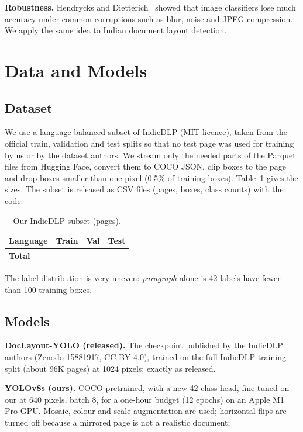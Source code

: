 \textbf{Robustness.} Hendrycks and Dietterich~\cite{hendrycks} showed that image classifiers lose much accuracy
under common corruptions such as blur, noise and JPEG compression. We apply the same idea to Indian document
layout detection.

\section{Data and Models}
\subsection{Dataset}
We use a language-balanced subset of IndicDLP (MIT licence), taken from the official train, validation and test
splits so that no test page was used for training by us or by the dataset authors. We stream only the needed
parts of the Parquet files from Hugging Face, convert them to COCO JSON, clip boxes to the page and drop boxes
smaller than one pixel (0.5\% of training boxes). Table~\ref{tab:data} gives the sizes. The subset is released as
CSV files (pages, boxes, class counts) with the code.

\begin{table}[t]
\centering
\caption{Our IndicDLP subset (pages).}
\label{tab:data}
\small
\begin{tabular}{lrrr}
\toprule
Language & Train & Val & Test \\
\midrule
\midrule
\textbf{Total} & \textbf{%
Boxes & %
\bottomrule
\end{tabular}
\end{table}

The label distribution is very uneven: \emph{paragraph} alone is %
42 labels have fewer than 100 training boxes.

\subsection{Models}
\textbf{DocLayout-YOLO (released).} The checkpoint published by the IndicDLP authors (Zenodo 15881917, CC-BY 4.0),
trained on the full IndicDLP training split (about 96K pages) at 1024 pixels; %
exactly as released.

\textbf{YOLOv8s (ours).} COCO-pretrained, with a new 42-class head, fine-tuned on our %
at 640 pixels, batch 8, for a one-hour budget (12 epochs) on an Apple M1 Pro GPU. Mosaic, colour and scale
augmentation are used; horizontal flips are turned off because a mirrored page is not a realistic document;

